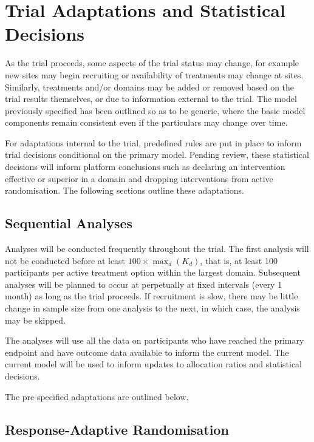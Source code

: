 \documentclass[
  11pt,
]{article}
\begin{document}
\hypertarget{trial-adaptations-and-statistical-decisions}{%
\section{Trial Adaptations and Statistical Decisions}\label{trial-adaptations-and-statistical-decisions}}

As the trial proceeds, some aspects of the trial status may change, for example new sites may begin recruiting or availability of treatments may change at sites.
Similarly, treatments and/or domains may be added or removed based on the trial results themselves, or due to information external to the trial. The model previously specified has been outlined so as to be generic, where the basic model components remain consistent even if the particulars may change over time.

For adaptations internal to the trial, predefined rules are put in place to inform trial decisions conditional on the primary model.
Pending review, these statistical decisions will inform platform conclusions such as declaring an intervention effective or superior in a domain and dropping interventions from active randomisation. The following sections outline these adaptations.

\hypertarget{sequential-analyses}{%
\subsection{Sequential Analyses}\label{sequential-analyses}}

Analyses will be conducted frequently throughout the trial.
The first analysis will not be conducted before at least \(100\times\max_d(K_d)\), that is, at least 100 participants per active treatment option within the largest domain.
Subsequent analyses will be planned to occur at perpetually at fixed intervals (every 1 month) as long as the trial proceeds.
If recruitment is slow, there may be little change in sample size from one analysis to the next, in which case, the analysis may be skipped.

The analyses will use all the data on participants who have reached the primary endpoint and have outcome data available to inform the current model.
The current model will be used to inform updates to allocation ratios and statistical decisions.

The pre-specified adaptations are outlined below.

\hypertarget{response-adaptive-randomisation}{%
\subsection{Response-Adaptive Randomisation}\label{response-adaptive-randomisation}}
\end{document}

